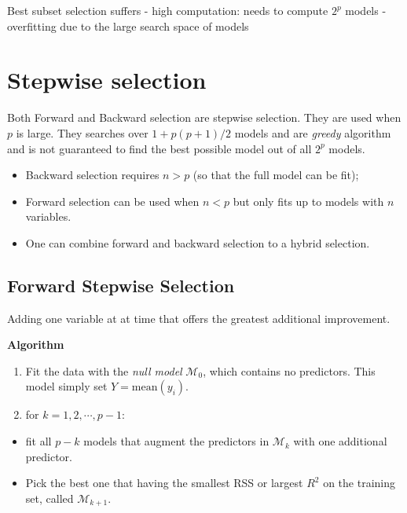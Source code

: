\documentclass[
  letterpaper,
  DIV=11,
  numbers=noendperiod]{scrreprt}
\providecommand{\tightlist}{%
  \setlength{\itemsep}{0pt}\setlength{\parskip}{0pt}}\usepackage{longtable,booktabs,array}
\begin{document}
Best subset selection suffers - high computation: needs to compute
\(2^p\) models - overfitting due to the large search space of models

\section{Stepwise selection}\label{stepwise-selection}

Both Forward and Backward selection are stepwise selection. They are
used when \(p\) is large. They searches over \(1+p(p+1)/2\) models and
are \emph{greedy} algorithm and is not guaranteed to find the best
possible model out of all \(2^p\) models.

\begin{itemize}
\tightlist
\item
  Backward selection requires \(n>p\) (so that the full model can be
  fit);
\item
  Forward selection can be used when \(n<p\) but only fits up to models
  with \(n\) variables.
\item
  One can combine forward and backward selection to a hybrid selection.
\end{itemize}

\subsection{Forward Stepwise
Selection}\label{forward-stepwise-selection}

Adding one variable at at time that offers the greatest additional
improvement.

\textbf{Algorithm}

\begin{enumerate}
\def\labelenumi{\arabic{enumi}.}
\tightlist
\item
  Fit the data with the \emph{null model} \(\mathcal{M}_0\), which
  contains no predictors. This model simply set \(Y=\text{mean}(y_i)\).
\item
  for \(k=1, 2, \cdots, p-1\):
\end{enumerate}

\begin{itemize}
\tightlist
\item
  fit all \(p-k\) models that augment the predictors in
  \(\mathcal{M}_k\) with one additional predictor.
\item
  Pick the best one that having the smallest RSS or largest \(R^2\) on
  the training set, called \(\mathcal{M}_{k+1}\).
\end{itemize}
\end{document}
